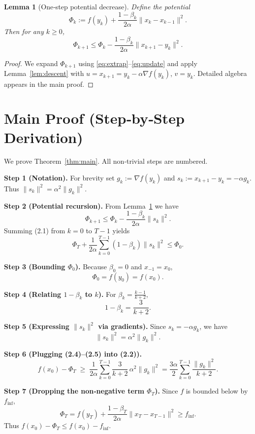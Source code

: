\documentclass{article}
\newtheorem{lemma}{Lemma}
\begin{document}
\begin{lemma}[One‑step potential decrease]\label{lem:potential}
Define the potential
\[
\Phi_k := f(y_k) + \frac{1-\beta_k}{2\alpha}\|x_k-x_{k-1}\|^2 .
\]
Then for any $k\ge 0$,
\[
\Phi_{k+1} \le \Phi_k - \frac{1-\beta_k}{2\alpha}\|x_{k+1}-y_k\|^2 .
\]
\end{lemma}
\begin{proof}
We expand $\Phi_{k+1}$ using \eqref{eq:extrap}–\eqref{eq:update} and apply
Lemma~\ref{lem:descent} with $u = x_{k+1}=y_k-\alpha\nabla f(y_k)$,
$v = y_k$.  Detailed algebra appears in the main proof.
\end{proof}

\section*{Main Proof (Step‑by‑Step Derivation)}
We prove Theorem~\ref{thm:main}.  All non‑trivial steps are numbered.

\medskip
\noindent\textbf{Step 1 (Notation).}  
For brevity set $g_k:=\nabla f(y_k)$ and $s_k:=x_{k+1}-y_k=-\alpha g_k$.
Thus $\|s_k\|^2=\alpha^2\|g_k\|^2$.

\medskip
\noindent\textbf{Step 2 (Potential recursion).}  
From Lemma~\ref{lem:potential} we have
\[
\Phi_{k+1} \le \Phi_k - \frac{1-\beta_k}{2\alpha}\|s_k\|^2 .
\tag{2.1}
\]
Summing (2.1) from $k=0$ to $T-1$ yields
\[
\Phi_T + \frac{1}{2\alpha}\sum_{k=0}^{T-1}(1-\beta_k)\|s_k\|^2
\le \Phi_0 .
\tag{2.2}
\]

\medskip
\noindent\textbf{Step 3 (Bounding $\Phi_0$).}  
Because $\beta_0=0$ and $x_{-1}=x_0$,
\[
\Phi_0 = f(y_0) = f(x_0) .
\tag{2.3}
\]

\medskip
\noindent\textbf{Step 4 (Relating $1-\beta_k$ to $k$).}  
For $\beta_k = \frac{k-1}{k+2}$,
\[
1-\beta_k = \frac{3}{k+2}.
\tag{2.4}
\]

\medskip
\noindent\textbf{Step 5 (Expressing $\|s_k\|^2$ via gradients).}
Since $s_k=-\alpha g_k$, we have
\[
\|s_k\|^2 = \alpha^2\|g_k\|^2 .
\tag{2.5}
\]

\medskip
\noindent\textbf{Step 6 (Plugging (2.4)–(2.5) into (2.2)).}
\[
f(x_0)-\Phi_T
\;\ge\;
\frac{1}{2\alpha}\sum_{k=0}^{T-1}\frac{3}{k+2}\,\alpha^2\|g_k\|^2
=
\frac{3\alpha}{2}\sum_{k=0}^{T-1}\frac{\|g_k\|^2}{k+2}.
\tag{2.6}
\]

\medskip
\noindent\textbf{Step 7 (Dropping the non‑negative term $\Phi_T$).}
Since $f$ is bounded below by $f_{\inf}$,
\[
\Phi_T = f(y_T)+\frac{1-\beta_T}{2\alpha}\|x_T-x_{T-1}\|^2
\ge f_{\inf}.
\tag{2.7}
\]
Thus $f(x_0)-\Phi_T \le f(x_0)-f_{\inf}$.
\end{document}
